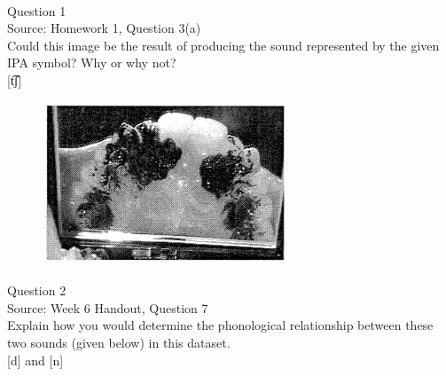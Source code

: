 \documentclass[12pt]{article}
\begin{document}
\newpage

\begin{center}
\textbf{{\color{red}{\HUGE END OF EXAM}}}\\

\end{center}
\newpage

\begin{center}
\textbf{{\color{blue}{\HUGE START OF EXAM\\}}}

\textbf{{\color{blue}{\HUGE Student ID: 55084\\}}}

\textbf{{\color{blue}{\HUGE 4:20\\}}}

\end{center}
\newpage

{\large Question 1}\\

Source: Homework 1, Question 3(a)\\

Could this image be the result of producing the sound represented by the given IPA symbol? Why or why not?\\

{[t͡ʃ]}

\begin{figure}[H]
\includegraphics{../images/staticpalatography_fricative.png}
\end{figure}

\newpage

{\large Question 2}\\

Source: Week 6 Handout, Question 7\\

Explain how you would determine the phonological relationship between these two sounds (given below) in this dataset.\\

{[d]} and {[n]}
\end{document}
